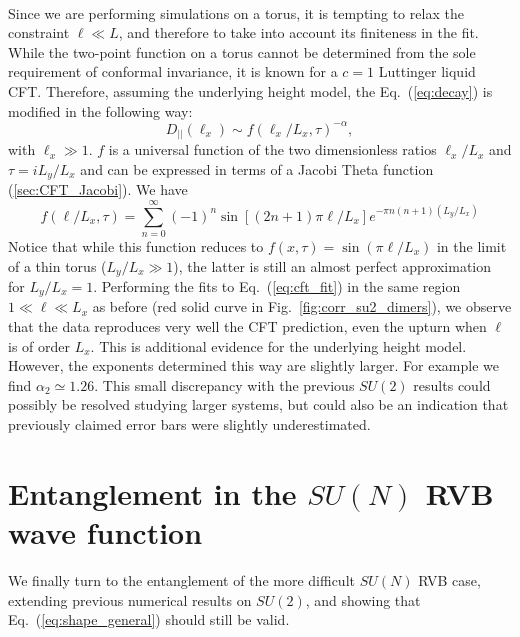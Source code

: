 \documentclass[11pt]{iopart}
\begin{document}
\paragraph{}
Since we are performing simulations on a torus, it is tempting to relax the constraint $\ell \ll L$, and therefore to take into account its finiteness in the fit. While the two-point function on a torus cannot be determined from the sole requirement of conformal invariance, it is known for a $c=1$ Luttinger liquid CFT\cite{BigYellowBook}. Therefore, assuming the underlying height model, the Eq.~(\ref{eq:decay}) is modified in the following way:
\begin{equation}\label{eq:cft_fit}
 D_{||}(\ell_x)\sim f(\ell_x/L_x,\tau)^{-\alpha},
\end{equation}
with $\ell_x \gg 1$. $f$ is a universal function of the two dimensionless ratios $\ell_x/L_x$ and $\tau =i L_y/L_x$ and can be expressed in terms of a Jacobi Theta function (\ref{sec:CFT_Jacobi}). We have 
\begin{equation}
 f(\ell/L_x,\tau)=\sum_{n=0}^{\infty}(-1)^n \sin \left[(2n+1)\pi \ell/L_x\right]e^{-\pi n(n+1)(L_y/L_x)}
\end{equation}
Notice that while this function reduces to $f(x,\tau)=\sin(\pi \ell/L_x)$ in the limit of a thin torus ($L_y/L_x \gg 1$), the latter is still an almost perfect approximation for $L_y/L_x=1$. Performing the fits to Eq.~(\ref{eq:cft_fit}) in the same region $1\ll \ell \ll L_x$ as before (red solid curve in Fig.~\ref{fig:corr_su2_dimers}), we observe that the data reproduces very well the CFT prediction, even the upturn when $\ell$ is of order $L_x$. This is additional evidence for the underlying height model. However, the exponents determined this way are slightly larger. For example we find $\alpha_2\simeq 1.26$. This small discrepancy with the previous $SU(2)$ results\cite{RVB1,RVB2} could possibly be resolved studying larger systems, but could also be an indication that previously claimed error bars were slightly underestimated.  
\section{Entanglement in the $SU(N)$ RVB wave function}
\label{sec:rvb_entanglement}
We finally turn to the entanglement of the more difficult $SU(N)$ RVB case, extending previous numerical results\cite{Ju2012} on $SU(2)$, and showing that Eq.~(\ref{eq:shape_general}) should still be valid. 
\end{document}
